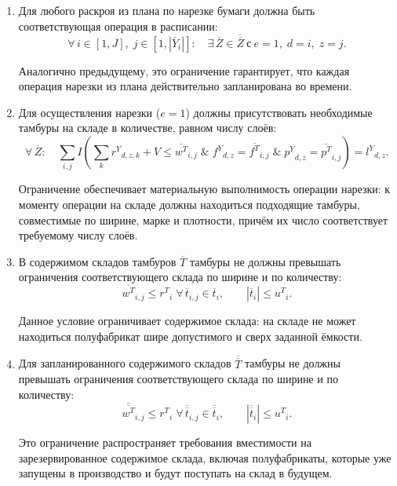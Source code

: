 \begin{enumerate}
    Данное условие исключает ситуации, когда тамбур присутствует в плане выпуска, но не включён в расписание, то есть фактически не производится.

    \item Для любого раскроя из плана по нарезке бумаги должна быть соответствующая операция в расписании:
    \[
    \forall\, i \in [1, J],\; j \in [1,|{\overline{Y}}_{i}|]:\quad \exists\,\overline{Z} \in \overline{\overline{Z}}\ \text{с} \ e = 1,\; d = i,\; z = j.
    \]

    Аналогично предыдущему, это ограничение гарантирует, что каждая операция нарезки из плана действительно запланирована во времени.

    \item Для осуществления нарезки ($e = 1$) должны присутствовать необходимые тамбуры на складе в количестве, равном числу слоёв:
    \[
    \forall\,\overline{Z}:\quad \sum_{i,j} I\!\left( \sum_{k}{r^Y}_{d,z,k} + V \leq {\overline{w^T}}_{i,j} \;\&\; {{f^Y}}_{d,z} = {\overline{f^T}}_{i,j} \;\&\; {{p^Y}}_{d,z} = {\overline{p^T}}_{i,j} \right) = {{l^Y}}_{d,z}.
    \]

    Ограничение обеспечивает материальную выполнимость операции нарезки: к моменту операции на складе должны находиться подходящие тамбуры, совместимые по ширине, марке и плотности, причём их число соответствует требуемому числу слоёв.

    \item В содержимом складов тамбуров $\overline{T}$ тамбуры не должны превышать ограничения соответствующего склада по ширине и по количеству:
    \[
    {\overline{w^T}}_{i,j} \leq {r^T}_{i}\;\forall\,{\overline{t}}_{i,j} \in {\overline{t}}_{i},\qquad \left| {\overline{t}}_{i} \right| \leq {u^T}_{i}.
    \]

    Данное условие ограничивает содержимое склада: на складе не может находиться полуфабрикат шире допустимого и сверх заданной ёмкости.

    \item Для запланированного содержимого складов $\overline{\overline{T}}$ тамбуры не должны превышать ограничения соответствующего склада по ширине и по количеству:
    \[
    {\overline{\overline{w^T}}}_{i,j} \leq {r^T}_{i}\;\forall\,{\overline{\overline{t}}}_{i,j} \in {\overline{\overline{t}}}_{i},\qquad \left| {\overline{\overline{t}}}_{i} \right| \leq {u^T}_{i}.    
    \]
 
    Это ограничение распространяет требования вместимости на зарезервированное содержимое склада, включая полуфабрикаты, которые уже запущены в производство и будут поступать на склад в будущем.


\end{enumerate}
